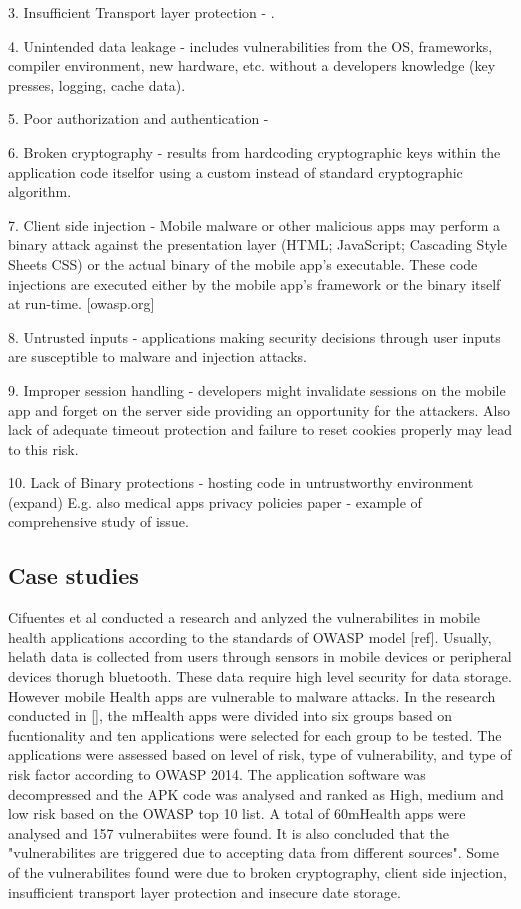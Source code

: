 \documentclass{mproj}
\begin{document}
3. Insufficient Transport layer protection - .

4. Unintended data leakage -  includes vulnerabilities from the OS, frameworks, compiler environment, new hardware, etc. without a developers knowledge (key presses, logging, cache data).

5. Poor authorization and authentication - 

6. Broken cryptography - results from hardcoding cryptographic keys within the application code itselfor using a custom instead of standard cryptographic algorithm.

7. Client side injection - Mobile malware or other malicious apps may perform a binary attack against the presentation layer (HTML; JavaScript; Cascading Style Sheets CSS) or the actual binary of the mobile app's executable. These code injections are executed either by the mobile app's framework or the binary itself at run-time. [owasp.org]

8. Untrusted inputs - applications making security decisions through user inputs are susceptible to malware and injection attacks.

9. Improper session handling - developers might invalidate sessions on the mobile app and forget on the server side providing an opportunity for the attackers. Also lack of adequate timeout protection and failure to reset cookies properly may lead to this risk.

10. Lack of Binary protections - hosting code in untrustworthy environment (expand)
E.g. also medical apps privacy policies paper - example of comprehensive study of issue.

\subsection{Case studies}
Cifuentes et al conducted a research and anlyzed the vulnerabilites in mobile health applications according to the standards of OWASP model [ref].  Usually, helath data is collected from users through sensors in mobile devices or peripheral devices thorugh bluetooth. These data require high level security for data storage. However mobile Health apps are vulnerable to malware attacks. In the research conducted in [], the mHealth apps were divided into six groups based on fucntionality and ten applications were selected for each group to be tested. The applications were assessed based on level of risk, type of
vulnerability, and type of risk factor according to OWASP 2014. The application software was decompressed and the APK code was analysed and ranked as High, medium and low risk based on the OWASP top 10 list. A total of 60mHealth apps were analysed and 157 vulnerabiites were found. It is also concluded that the "vulnerabilites are triggered due to accepting data from different sources". Some of the vulnerabilites found were due to broken cryptography, client side injection, insufficient transport layer protection and insecure date storage.
\end{document}
